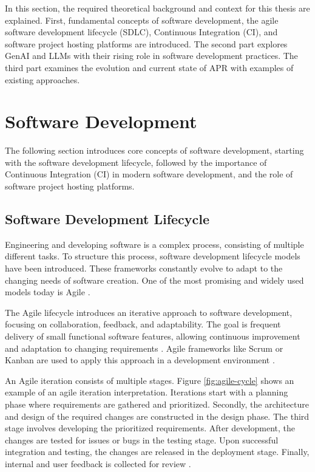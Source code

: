 In this section, the required theoretical background and context for this thesis are explained. First, fundamental concepts of software development, the agile software development lifecycle (SDLC), Continuous Integration (CI), and software project hosting platforms are introduced. The second part explores \ac{GenAI} and \acp{LLM} with their rising role in software development practices. The third part examines the evolution and current state of \ac{APR} with examples of existing approaches.

\section{Software Development}

The following section introduces core concepts of software development, starting with the software development lifecycle, followed by the importance of Continuous Integration (CI) in modern software development, and the role of software project hosting platforms.

\subsection{Software Development Lifecycle}
Engineering and developing software is a complex process, consisting of multiple different tasks. To structure this process, software development lifecycle models have been introduced. These frameworks constantly evolve to adapt to the changing needs of software creation. One of the most promising and widely used models today is Agile \cite{rupareliaSoftwareDevelopmentLifecycle2010, abrahamssonAgileSoftwareDevelopment2017}.

The Agile lifecycle introduces an iterative approach to software development, focusing on collaboration, feedback, and adaptability. The goal is frequent delivery of small functional software features, allowing continuous improvement and adaptation to changing requirements \cite{rupareliaSoftwareDevelopmentLifecycle2010, abrahamssonAgileSoftwareDevelopment2017}. Agile frameworks like Scrum or Kanban are used to apply this approach in a development environment \cite{zayatFrameworkStudyAgile2020}.

An Agile iteration consists of multiple stages. Figure \ref{fig:agile-cycle} shows an example of an agile iteration interpretation. Iterations start with a planning phase where requirements are gathered and prioritized. Secondly, the architecture and design of the required changes are constructed in the design phase. The third stage involves developing the prioritized requirements. After development, the changes are tested for issues or bugs in the testing stage. Upon successful integration and testing, the changes are released in the deployment stage. Finally, internal and user feedback is collected for review \cite{huoSoftwareQualityAgile2004}.

